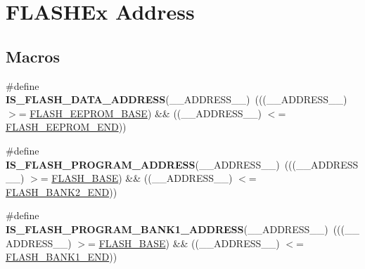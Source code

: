\hypertarget{group___f_l_a_s_h_ex___address}{\section{F\-L\-A\-S\-H\-Ex Address}
\label{group___f_l_a_s_h_ex___address}
}
\subsection*{Macros}
\begin{DoxyCompactItemize}
\item 
\hypertarget{group___f_l_a_s_h_ex___address_ga82ec8ebb9c08428f2a65ea5545b57d45}{\#define {\bfseries I\-S\-\_\-\-F\-L\-A\-S\-H\-\_\-\-D\-A\-T\-A\-\_\-\-A\-D\-D\-R\-E\-S\-S}(\-\_\-\-\_\-\-A\-D\-D\-R\-E\-S\-S\-\_\-\-\_\-)~(((\-\_\-\-\_\-\-A\-D\-D\-R\-E\-S\-S\-\_\-\-\_\-) $>$= \hyperlink{group___peripheral__memory__map_ga45b9071c81cb72a66e2e3195343fcb3a}{F\-L\-A\-S\-H\-\_\-\-E\-E\-P\-R\-O\-M\-\_\-\-B\-A\-S\-E}) \&\& ((\-\_\-\-\_\-\-A\-D\-D\-R\-E\-S\-S\-\_\-\-\_\-) $<$= \hyperlink{group___peripheral__memory__map_gac8cb9b66893a7c4bdff3258909af027a}{F\-L\-A\-S\-H\-\_\-\-E\-E\-P\-R\-O\-M\-\_\-\-E\-N\-D}))}\label{group___f_l_a_s_h_ex___address_ga82ec8ebb9c08428f2a65ea5545b57d45}

\item 
\hypertarget{group___f_l_a_s_h_ex___address_gac07480adefa0f54a920561a97c2e5b8a}{\#define {\bfseries I\-S\-\_\-\-F\-L\-A\-S\-H\-\_\-\-P\-R\-O\-G\-R\-A\-M\-\_\-\-A\-D\-D\-R\-E\-S\-S}(\-\_\-\-\_\-\-A\-D\-D\-R\-E\-S\-S\-\_\-\-\_\-)~(((\-\_\-\-\_\-\-A\-D\-D\-R\-E\-S\-S\-\_\-\-\_\-) $>$= \hyperlink{group___peripheral__memory__map_ga23a9099a5f8fc9c6e253c0eecb2be8db}{F\-L\-A\-S\-H\-\_\-\-B\-A\-S\-E}) \&\& ((\-\_\-\-\_\-\-A\-D\-D\-R\-E\-S\-S\-\_\-\-\_\-) $<$= \hyperlink{group___peripheral__memory__map_gab24a21b645aaab8737af5603c3d11e71}{F\-L\-A\-S\-H\-\_\-\-B\-A\-N\-K2\-\_\-\-E\-N\-D}))}\label{group___f_l_a_s_h_ex___address_gac07480adefa0f54a920561a97c2e5b8a}

\item 
\hypertarget{group___f_l_a_s_h_ex___address_ga30dc5a0fc69e32d9c21b86c8fd5b03c1}{\#define {\bfseries I\-S\-\_\-\-F\-L\-A\-S\-H\-\_\-\-P\-R\-O\-G\-R\-A\-M\-\_\-\-B\-A\-N\-K1\-\_\-\-A\-D\-D\-R\-E\-S\-S}(\-\_\-\-\_\-\-A\-D\-D\-R\-E\-S\-S\-\_\-\-\_\-)~(((\-\_\-\-\_\-\-A\-D\-D\-R\-E\-S\-S\-\_\-\-\_\-) $>$= \hyperlink{group___peripheral__memory__map_ga23a9099a5f8fc9c6e253c0eecb2be8db}{F\-L\-A\-S\-H\-\_\-\-B\-A\-S\-E}) \&\& ((\-\_\-\-\_\-\-A\-D\-D\-R\-E\-S\-S\-\_\-\-\_\-) $<$= \hyperlink{group___peripheral__memory__map_ga443a2786535d83e32dfdc2b29e379332}{F\-L\-A\-S\-H\-\_\-\-B\-A\-N\-K1\-\_\-\-E\-N\-D}))}\label{group___f_l_a_s_h_ex___address_ga30dc5a0fc69e32d9c21b86c8fd5b03c1}


\end{DoxyCompactItemize}
